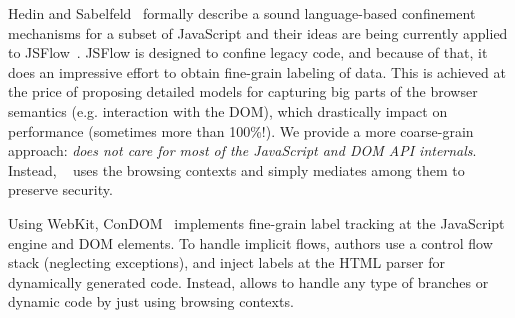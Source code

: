 Hedin and Sabelfeld~\cite{Hedin:2012} formally describe a sound language-based
confinement mechanisms for a subset of JavaScript and their ideas are being
currently applied to JSFlow~\cite{JSFlow}. %
JSFlow is designed to confine legacy code, and because of that, it does an
impressive effort to obtain fine-grain labeling of data. This is achieved at the
price of proposing detailed models for capturing big parts of the browser
semantics (e.g. interaction with the DOM), which drastically impact on
performance (sometimes more than 100\%!).  We provide a more coarse-grain
approach: \emph{\sys{} does not care for most of the JavaScript and DOM API
  internals}. Instead, \sys~ uses the browsing contexts and simply
mediates among them to preserve security.

Using WebKit, ConDOM~\cite{ConDOM} implements fine-grain label tracking at the
JavaScript engine and DOM elements. To handle implicit flows, authors use a
control flow stack (neglecting exceptions), and inject labels at the HTML parser
for dynamically generated code. Instead, \sys{} allows to handle any type of
branches or dynamic code by just using browsing contexts.

